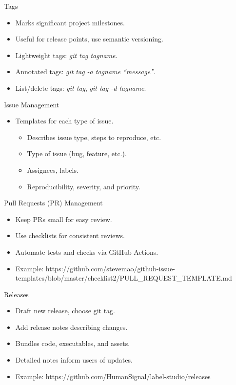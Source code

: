 \documentclass[aspectratio=169]{beamer}
\begin{document}
\begin{frame}{Tags}
    \begin{itemize}
        \item Marks significant project milestones.
        \item Useful for release points, use semantic versioning.
        \item Lightweight tags: \textit{git tag tagname}.
        \item Annotated tags: \textit{git tag -a tagname ``message''}.
        \item List/delete tags: \textit{git tag}, \textit{git tag -d tagname}.
    \end{itemize}
\end{frame} 
\begin{frame}{Issue Management}
    \begin{itemize}
        \item Templates for each type of issue.
        \begin{itemize}
            \item Describes issue type, steps to reproduce, etc.
            \item Type of issue (bug, feature, etc.).
            \item Assignees, labels.
            \item Reproducibility, severity, and priority.
        \end{itemize}
    \end{itemize}
\end{frame}   
\begin{frame}{Pull Requests (PR) Management}
    \begin{itemize}
        \item Keep PRs small for easy review.
        \item Use checklists for consistent reviews.
        \item Automate tests and checks via GitHub Actions.
        \item Example: https://github.com/stevemao/github-issue-templates/blob/master/checklist2/PULL\_REQUEST\_TEMPLATE.md
    \end{itemize}
\end{frame}
\begin{frame}{Releases}
    \begin{itemize}
        \item Draft new release, choose git tag.
        \item Add release notes describing changes.
        \item Bundles code, executables, and assets.
        \item Detailed notes inform users of updates.
        \item Example: https://github.com/HumanSignal/label-studio/releases
    \end{itemize}
\end{frame}
\end{document}
